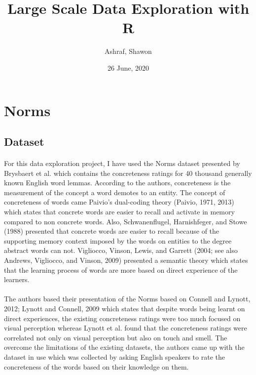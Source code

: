\documentclass[11pt,a4paper]{article}
\begin{document}
\title{Large Scale Data Exploration with R}
\author{Ashraf, Shawon}
\date{26 June, 2020}

\maketitle


\section{Norms}

\subsection{Dataset}

\paragraph{}
For this data exploration project, I have used the Norms dataset presented by Brysbaert et al. \cite{brys:1} which contains the concreteness ratings for 40 thousand generally known English word lemmas. According to the authors, concreteness is the measurement of the concept a word demotes to an entity. The concept of concreteness of words came Paivio’s dual-coding theory (Paivio, 1971, 2013) which states that concrete words are easier to recall and activate in memory compared to non concrete words. Also,  Schwanenflugel, Harnishfeger, and Stowe (1988) presented that concrete words are easier to recall because of the supporting memory context imposed by the words on entities to the degree abstract words can not. Vigliocco, Vinson, Lewis, and Garrett (2004; see also Andrews, Vigliocco, and Vinson, 2009) presented a semantic theory which states that the learning process of words are more based on direct experience of the learners.

\paragraph{}
The authors based their presentation of the Norms based on Connell and Lynott, 2012; Lynott and Connell, 2009 which states that despite words being learnt on direct experiences, the existing concreteness ratings were too much focused on visual perception whereas Lynott et al. found that the concreteness ratings were correlated not only on visual perception but also on touch and smell. The overcome the limitations of the existing datasets, the authors came up with the dataset in use which was collected by asking English speakers to rate the concreteness of the words based on their knowledge on them.
\end{document}

